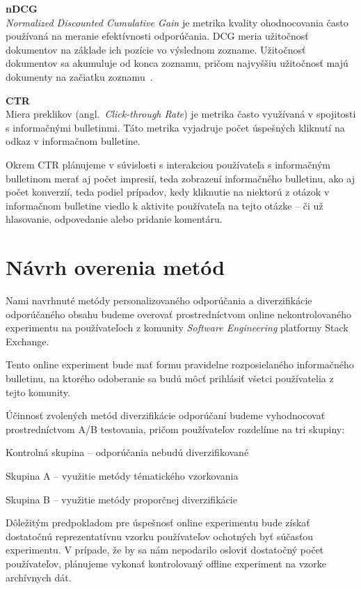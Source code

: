 \textbf{nDCG}\\
\textit{Normalized Discounted Cumulative Gain} je metrika kvality ohodnocovania často používaná na meranie efektívnosti
odporúčania. DCG meria užitočnosť dokumentov na základe ich pozície vo výslednom zozname. Užitočnosť dokumentov sa akumuluje
od konca zoznamu, pričom najvyššiu užitočnosť majú dokumenty na začiatku zoznamu~\cite{Jrvelin2002}.

\textbf{CTR}\\
Miera preklikov (angl.~\emph{Click-through Rate}) je metrika často využívaná v spojitosti s informačnými bulletinmi.
Táto metrika vyjadruje počet úspešných kliknutí na odkaz v informačnom bulletine.

Okrem CTR plánujeme v súvislosti s interakciou používateľa s informačným bulletinom merať aj počet impresií,
teda zobrazení informačného bulletinu, ako aj počet konverzií, teda podiel prípadov, kedy kliknutie na niektorú z otázok
v informačnom bulletine viedlo k aktivite používateľa na tejto otázke -- či už hlasovanie, odpovedanie alebo pridanie komentáru.


\section{Návrh overenia metód}

Nami navrhnuté metódy personalizovaného odporúčania a diverzifikácie odporúčaného obsahu budeme overovať prostredníctvom
online nekontrolovaného experimentu na používateľoch z komunity \textit{Software Engineering} platformy Stack Exchange.

Tento online experiment bude mať formu pravidelne rozposielaného informačného bulletinu, na ktorého odoberanie sa budú
môcť prihlásiť všetci používatelia z tejto komunity.

Účinnosť zvolených metód diverzifikácie odporúčaní budeme vyhodnocovať prostredníctvom A/B testovania, pričom používateľov
rozdelíme na tri skupiny:
\begin{my_enumerate}
    \item{Kontrolná skupina -- odporúčania nebudú diverzifikované}
    \item{Skupina A -- využitie metódy tématického vzorkovania}
    \item{Skupina B -- využitie metódy proporčnej diverzifikácie}
\end{my_enumerate}

Dôležitým predpokladom pre úspešnosť online experimentu bude získať dostatočnú reprezentatívnu vzorku používateľov
ochotných byť súčasťou experimentu. V prípade, že by sa nám nepodarilo osloviť dostatočný počet používateľov, plánujeme
vykonať kontrolovaný offline experiment na vzorke archívnych dát.
